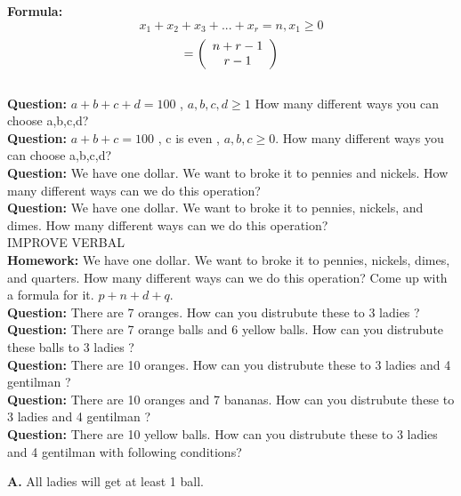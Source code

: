 \documentclass[11pt]{article}
\begin{document}
\textbf{Formula: } $$x_1 + x_2 + x_3 + ... + x_r = n , x_1 \geq 0$$ $$= \left( {\begin{array}{*{20}c} n+r-1 \\ r-1 \\ \end{array}} \right)$$\
\\

\textbf{Question: }  $a+b+c+d = 100$ , $a,b,c,d \geq 1$ How many different ways you can choose a,b,c,d?
\\ %

\textbf{Question: }  $a+b+c = 100$ , c is even , $a,b,c \geq 0$. How many different ways you can choose a,b,c,d?
\\ %

\textbf{Question: }  We have one dollar. We want to broke it to pennies and nickels. How many different ways can we do this operation?
\\ %

\textbf{Question: }  We have one dollar. We want to broke it to pennies, nickels, and dimes. How many different ways can we do this operation?
\\ %

IMPROVE VERBAL
\\

\textbf{Homework: } We have one dollar. We want to broke it to pennies, nickels, dimes, and quarters. How many different ways can we do this operation? Come up with a formula for it. $p+n+d+q$.
\\ %

\textbf{Question: }  There are 7 oranges. How can you distrubute these to 3 ladies ?
\\ %

\textbf{Question: }  There are 7 orange balls and 6 yellow balls. How can you distrubute these balls to 3 ladies ?
\\ %

\textbf{Question: }  There are 10 oranges. How can you distrubute these to 3 ladies and 4 gentilman ?
\\ %

\textbf{Question: }  There are 10 oranges and 7 bananas. How can you distrubute these to 3 ladies and 4 gentilman ?
\\ %

\textbf{Question: }  There are 10 yellow balls. How can you distrubute these to 3 ladies and 4 gentilman with following conditions?
\par %
\textbf{A.} All ladies will get at least 1 ball.
\end{document}
